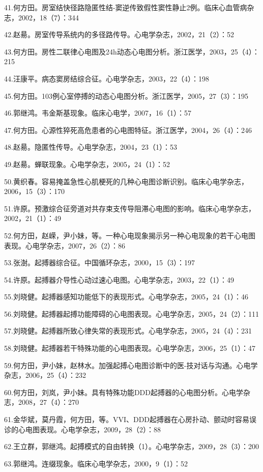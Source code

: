 \documentclass[
  12pt,
  twoside,
  banjiao]{ctexbook}
\begin{document}
41.何方田。房室结快径路隐匿性结-窦逆传致假性窦性静止2例。临床心血管病杂志，2002，18（7）：344

42.赵昜。房室传导系统内的多径路传导。心电学杂志，2002，21（2）：52

43.何方田。房性二联律心电图及24h动态心电图分析。浙江医学，2003，25（4）：215

44.汪康平。病态窦房结综合征。心电学杂志，2003，22（4）：198

45.何方田。103例心室停搏的动态心电图分析。浙江医学，2005，27（3）：195

46.郭继鸿。韦金斯基现象。临床心电学，2007，16（1）：57

47.何方田。心源性猝死高危患者的心电图特征。浙江医学，2004，26（4）：246

48.赵昜。隐匿性传导。心电学杂志，2004，23（1）：53

49.赵昜。蝉联现象。心电学杂志，2005，24（1）：52

50.黄织春。容易掩盖急性心肌梗死的几种心电图诊断识别。临床心电学杂志，2006，15（3）：170

51.许原。预激综合征旁道对共存束支传导阻滞心电图的影响。临床心电学杂志，2002，21（1）：49

52.何方田，赵嵘，尹小妹，等。一种心电现象揭示另一种心电现象的若干心电图表现。心电学杂志，2007，26（2）：86

53.张澍。起搏器综合征。中国循环杂志，2000，15（3）：197

54.许原。起搏器介导性心动过速心电图。心电学杂志，2003，22（1）：49

55.刘晓健。起搏器感知功能低下的表现形式。心电学杂志，2005，24（1）：46

56.刘晓健。起搏器起搏功能障碍的心电图表现。心电学杂志，2005，24（2）：111

57.刘晓健。起搏器所致心律失常的表现形式。心电学杂志，2005，24（4）：231

58.刘晓健。起搏器若干特殊功能的心电图表现。心电学杂志，2006，25（1）：47

59.何方田，尹小妹，赵林水。加强起搏心电图诊断中的医-技对话与沟通。心电学杂志，2006，25（4）：232

60.何方田，刘岚，尹小妹。具有特殊功能DDD起搏器的心电图分析。心电学杂志，2008，27（4）：270

61.金华斌，莫丹霞，何方田，等。VVI、DDD起搏器在心房扑动、颤动时容易误诊的心电图表现。心电学杂志，2009，28（2）：88

62.王立群，郭继鸿。起搏模式的自由转换（1）。心电学杂志，2009，28（3）：200

63.郭继鸿。连缀现象。临床心电学杂志，2000，9（1）：52
\end{document}
